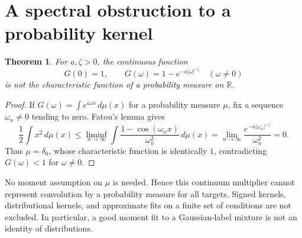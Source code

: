\documentclass[11pt]{article}
\newtheorem{theorem}{Theorem}
\newcommand{\R}{\mathbb R}
\begin{document}
\section{A spectral obstruction to a probability kernel}
\begin{theorem}\label{thm:filter}
For $a,\zeta>0$, the continuous function
\[
G(0)=1,\qquad G(\omega)=1-e^{-a|\omega|^{-\zeta}}\quad(\omega\ne0)
\]
is not the characteristic function of a probability measure on $\R$.
\end{theorem}
\begin{proof}
If $G(\omega)=\int e^{i\omega x}\,d\mu(x)$ for a probability measure $\mu$,
fix a sequence $\omega_n\ne0$ tending to zero. Fatou's lemma gives
\[
\frac12\int x^2\,d\mu(x)
\le\liminf_{n\to\infty}\int\frac{1-\cos(\omega_n x)}{\omega_n^2}\,d\mu(x)
=\lim_{n\to\infty}\frac{e^{-a|\omega_n|^{-\zeta}}}{\omega_n^2}=0.
\]
Thus $\mu=\delta_0$, whose characteristic function is identically $1$,
contradicting $G(\omega)<1$ for $\omega\ne0$.
\end{proof}
No moment assumption on $\mu$ is needed. Hence this continuum multiplier cannot
represent convolution by a probability measure for all targets. Signed kernels,
distributional kernels, and approximate fits on a finite set of conditions are
not excluded. In particular, a good moment fit to a Gaussian-label mixture is
not an identity of distributions.
\end{document}
